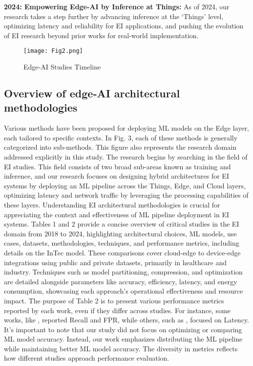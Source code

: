 \documentclass[11pt]{article}
\begin{document}
	\textbf{2024: Empowering Edge-AI by Inference at Things:} As of 2024, our research takes a
	step further by advancing inference at the ‘Things’ level, optimizing latency and
	reliability for EI applications, and pushing the evolution of EI research beyond
	prior works for real-world implementation.
	
	\begin{figure}[t]
		\centering
		\texttt{[image: Fig2.png]}
		\caption{Edge-AI Studies Timeline}
	\end{figure}
	
	\subsection{ Overview of edge‑AI architectural methodologies}
	Various methods have been proposed for deploying ML models on the Edge layer, each
	tailored to specific contexts. In Fig. 3, each of these methods is generally categorized
	into sub-methods. This figure also represents the research domain addressed explicitly
	in this study. The research begins by searching in the field of EI studies. This field consists of two broad sub-areas known as training and inference, and our research focuses
	on designing hybrid architectures for EI systems by deploying an ML pipeline across
	the Things, Edge, and Cloud layers, optimizing latency and network traffic by leveraging the processing capabilities of these layers. Understanding EI architectural methodologies is crucial for appreciating the context and effectiveness of ML pipeline deployment in EI systems. Tables 1 and 2 provide a concise overview of critical studies in
	the EI domain from 2018 to 2024, highlighting architectural choices, ML models, use
	cases, datasets, methodologies, techniques, and performance metrics, including details
	on the InTec model. These comparisons cover cloud-edge to device-edge integrations
	using public and private datasets, primarily in healthcare and industry. Techniques such
	as model partitioning, compression, and optimization are detailed alongside parameters like accuracy, efficiency, latency, and energy consumption, showcasing each approach’s
	operational effectiveness and resource impact. The purpose of Table 2 is to present various performance metrics reported by each work, even if they differ across studies. For
	instance, some works, like \cite{c23}, reported Recall and FPR, while others, such as \cite{c27}, focused on Latency. It’s important to note that our study did not focus on optimizing
	or comparing ML model accuracy. Instead, our work emphasizes distributing the ML
	pipeline while maintaining better ML model accuracy. The diversity in metrics reflects
	how different studies approach performance evaluation.
	
\end{document}
